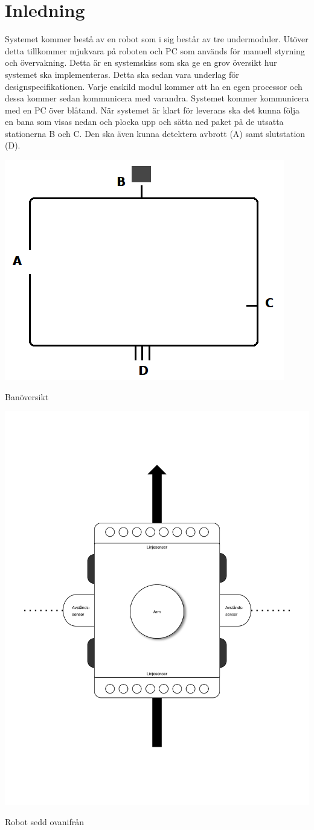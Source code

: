 \section{Inledning}
Systemet kommer bestå av en robot som i sig består av tre undermoduler. Utöver detta tillkommer mjukvara på roboten och PC som används för manuell styrning och övervakning. Detta är en systemskiss som ska ge en grov översikt hur systemet ska implementeras. Detta ska sedan vara underlag för designspecifikationen. 
\newline
\newline
Varje enskild modul kommer att ha en egen processor och dessa kommer sedan kommunicera med varandra. Systemet kommer kommunicera med en PC över blåtand. När systemet är klart för leverans ska det kunna följa en bana som visas nedan och plocka upp och sätta ned paket på de utsatta stationerna B och C. Den ska även kunna detektera avbrott (A) samt slutstation (D). 

\centerline{\includegraphics[scale=0.4]{figur}}
\centerline{Banöversikt}
\centerline{\includegraphics[scale=0.19]{robot}}
\centerline{Robot sedd ovanifrån}